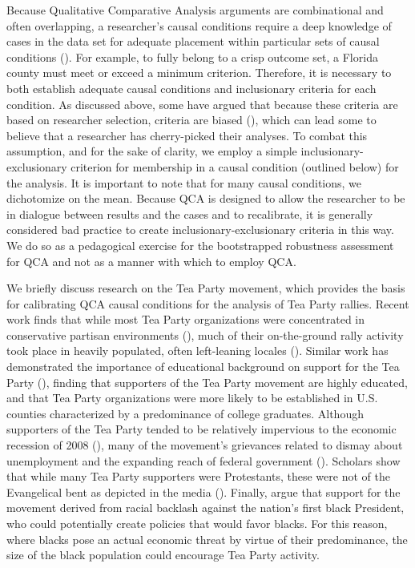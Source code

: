 \documentclass[12pt]{article}
\begin{document}
{Because Qualitative Comparative Analysis arguments are combinational and often overlapping, a researcher's causal conditions require a deep knowledge of cases in the data set for adequate placement within particular sets of causal conditions (\citealt{ragin_2008}). For example, to fully belong to a crisp outcome set, a Florida county must meet or exceed a minimum criterion. Therefore, it is necessary to both establish adequate causal conditions and inclusionary criteria for each condition. As discussed above, some have argued that because these criteria are based on researcher selection, criteria are biased (\citealt{lieberson_2004}), which can lead some to believe that a researcher has cherry-picked their analyses. To combat this assumption, and for the sake of clarity, we employ a simple inclusionary-exclusionary criterion for membership in a causal condition (outlined below) for the analysis. It is important to note that for many causal conditions, we dichotomize on the mean. Because QCA is designed to allow the researcher to be in dialogue between results and the cases and to recalibrate, it is generally considered bad practice to create inclusionary-exclusionary criteria in this way. We do so as a pedagogical exercise for the bootstrapped robustness assessment for QCA and not as a manner with which to employ QCA.

We briefly discuss research on the Tea Party movement, which provides the basis for calibrating QCA causal conditions for the analysis of Tea Party rallies. Recent work finds that while most Tea Party organizations were concentrated in conservative partisan environments (\citealt{mcveigh_et_al_2014a,skocpol_and_williamson_2012}), much of their on-the-ground rally activity took place in heavily populated, often left-leaning locales (\citealt{skocpol_and_williamson_2012,zernike_2010}). Similar work has demonstrated the importance of educational background on support for the Tea Party (\citealt{mcveigh_et_al_2014a,skocpol_and_williamson_2012}), finding that supporters of the Tea Party movement are highly educated, and that Tea Party organizations were more likely to be established in U.S. counties characterized by a predominance of college graduates. Although supporters of the Tea Party tended to be relatively impervious to the economic recession of 2008 (\citealt{skocpol_and_williamson_2012,parker_and_barreto_2013}), many of the movement's grievances related to dismay about unemployment and the expanding reach of federal government (\citealt{skocpol_and_williamson_2012,mcveigh_et_al_2014a,parker_and_barreto_2013}). Scholars show that while many Tea Party supporters were Protestants, these were not of the Evangelical bent as depicted in the media (\citealt{zernike_2010,skocpol_and_williamson_2012,mcveigh_et_al_2014a}). Finally, \citet{parker_and_barreto_2013} argue that support for the movement derived from racial backlash against the nation's first black President, who could potentially create policies that would favor blacks. For this reason, where blacks pose an actual economic threat by virtue of their predominance, the size of the black population could encourage Tea Party activity. 

}
\end{document}
